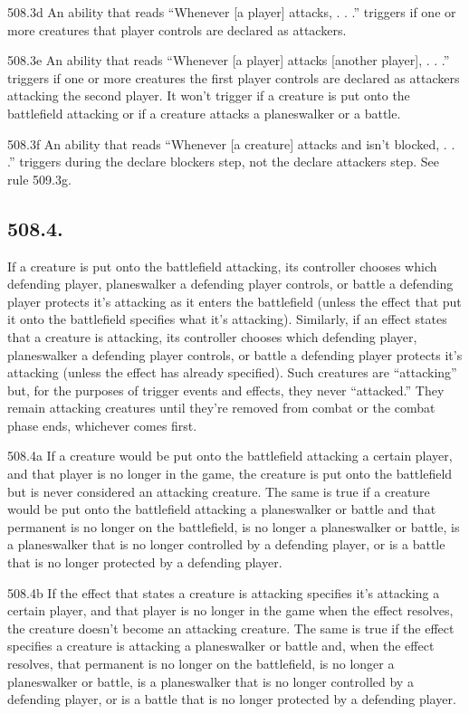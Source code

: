 508.3d An ability that reads “Whenever [a player] attacks, . . .” triggers if one or more creatures that player controls are declared as attackers.

508.3e An ability that reads “Whenever [a player] attacks [another player], . . .” triggers if one or more creatures the first player controls are declared as attackers attacking the second player. It won’t trigger if a creature is put onto the battlefield attacking or if a creature attacks a planeswalker or a battle.

508.3f An ability that reads “Whenever [a creature] attacks and isn’t blocked, . . .” triggers during the declare blockers step, not the declare attackers step. See rule 509.3g.

\subsection*{508.4.}
If a creature is put onto the battlefield attacking, its controller chooses which defending player, planeswalker a defending player controls, or battle a defending player protects it’s attacking as it enters the battlefield (unless the effect that put it onto the battlefield specifies what it’s attacking). Similarly, if an effect states that a creature is attacking, its controller chooses which defending player, planeswalker a defending player controls, or battle a defending player protects it’s attacking (unless the effect has already specified). Such creatures are “attacking” but, for the purposes of trigger events and effects, they never “attacked.” They remain attacking creatures until they’re removed from combat or the combat phase ends, whichever comes first.

508.4a If a creature would be put onto the battlefield attacking a certain player, and that player is no longer in the game, the creature is put onto the battlefield but is never considered an attacking creature. The same is true if a creature would be put onto the battlefield attacking a planeswalker or battle and that permanent is no longer on the battlefield, is no longer a planeswalker or battle, is a planeswalker that is no longer controlled by a defending player, or is a battle that is no longer protected by a defending player.

508.4b If the effect that states a creature is attacking specifies it’s attacking a certain player, and that player is no longer in the game when the effect resolves, the creature doesn’t become an attacking creature. The same is true if the effect specifies a creature is attacking a planeswalker or battle and, when the effect resolves, that permanent is no longer on the battlefield, is no longer a planeswalker or battle, is a planeswalker that is no longer controlled by a defending player, or is a battle that is no longer protected by a defending player.

